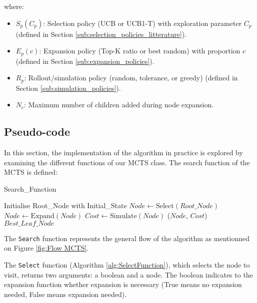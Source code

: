where:
\begin{itemize}
    \item $S_p(C_p)$: Selection policy (UCB or UCB1-T) with exploration parameter $C_p$ (defined in Section \ref{sub:selection_policies_litterature}).
    \item $E_p(c)$: Expansion policy (Top-K ratio or best random) with proportion $c$ (defined in Section \ref{sub:expansion_policies}).
    \item $R_p$: Rollout/simulation policy (random, tolerance, or greedy) (defined in Section \ref{sub:simulation_policies}).
    \item $N_c$: Maximum number of children added during node expansion.
\end{itemize}

\subsection{Pseudo-code}
In this section, the implementation of the algorithm in practice is explored by examining the different functions of our MCTS class. The search function of the MCTS is defined:

\begin{algorithm}[H]
    \caption{Search\_Function}
    \label{alg:MCTS}
    \begin{algorithmic}[1]
        \STATE Initialise Root\_Node with Initial\_State
        \STATE $Node \leftarrow \text{Select}(Root\_Node)$
        \STATE $Node \leftarrow \text{Expand}(Node)$
        \ENDIF
        \STATE $Cost \leftarrow \text{Simulate}(Node)$
        \STATE {}($Node$, $Cost$)
        \ENDWHILE
        \RETURN $Best\_Leaf\_Node$
    \end{algorithmic}
\end{algorithm}
The \texttt{Search} function represents the general flow of the algorithm as mentionned on Figure \ref{fig:Flow MCTS}.

The \texttt{Select} function (Algorithm \ref{alg:SelectFunction}), which selects the node to visit, returns two arguments: a boolean and a node. The boolean indicates to the expansion function whether expansion is necessary (True means no expansion needed, False means expansion needed).

